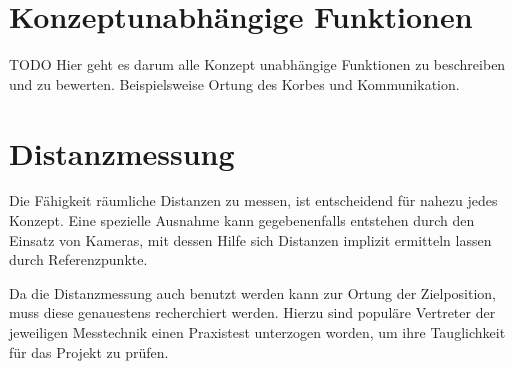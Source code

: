 \section{Konzeptunabhängige Funktionen}
TODO Hier geht es darum alle Konzept unabhängige Funktionen zu beschreiben
und zu bewerten. Beispielsweise Ortung des Korbes und Kommunikation.


\section{Distanzmessung}
Die Fähigkeit räumliche Distanzen zu messen, ist entscheidend für nahezu 
jedes Konzept. Eine spezielle Ausnahme kann gegebenenfalls entstehen durch
den Einsatz von Kameras, mit dessen Hilfe sich Distanzen implizit ermitteln
lassen durch Referenzpunkte.

Da die Distanzmessung auch benutzt werden kann zur Ortung der Zielposition,
muss diese genauestens recherchiert werden. Hierzu sind populäre Vertreter 
der jeweiligen Messtechnik einen Praxistest unterzogen worden, um ihre 
Tauglichkeit für das Projekt zu prüfen.


